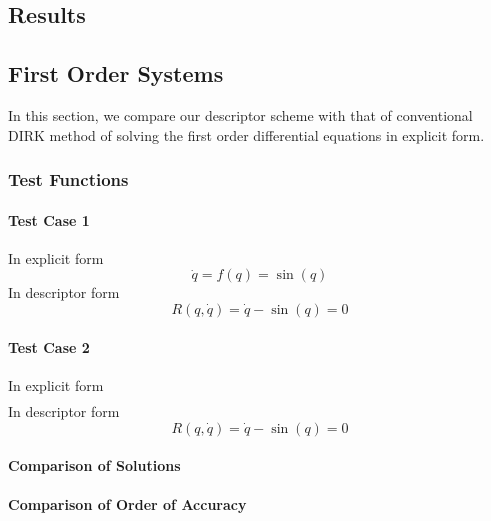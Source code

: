 \documentclass[pdftex,11pt,letter]{article}
\begin{document}
\begin{multicols}{2}

\section{Results}

\subsection{First Order Systems}

In this section, we compare our descriptor scheme with that of
conventional DIRK method of solving the first order differential
equations in explicit form.

\subsubsection{Test Functions}
 

\paragraph{Test Case 1}

In explicit form
\begin{equation}
  \dot{q} = f(q) = \sin(q)
\end{equation}
In descriptor form
\begin{equation}
  R(q, \dot{q}) = \dot{q}- \sin(q) = 0
\end{equation}

\paragraph{Test Case 2}

In explicit form
\begin{equation}
  \begin{split}
  \end{split}
\end{equation}
In descriptor form
\begin{equation}
  R(q, \dot{q}) = \dot{q}- \sin(q) = 0
\end{equation}

\paragraph{Comparison of Solutions}

\paragraph{Comparison of Order of Accuracy}

\end{multicols}
\end{document}
